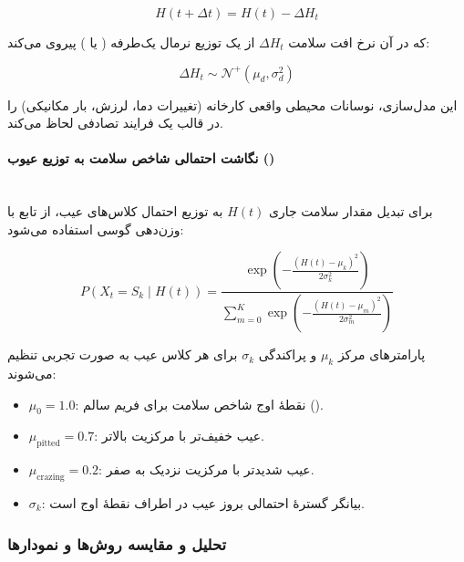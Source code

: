 \documentclass[a4paper, 10pt, twocolumn]{article}
\begin{document}
	$$H(t + \Delta t) = H(t) - \Delta H_t$$
	
	که در آن نرخ افت سلامت $\Delta H_t$ از یک توزیع نرمال یک‌طرفه ( یا ) پیروی می‌کند:
	
	$$\Delta H_t \sim \mathcal{N}^{+}(\mu_d, \sigma_d^2) $$
	
	این مدل‌سازی، نوسانات محیطی واقعی کارخانه (تغییرات دما، لرزش، بار مکانیکی) را در قالب یک فرایند تصادفی لحاظ می‌کند.
	
	\paragraph{نگاشت احتمالی شاخص سلامت به توزیع عیوب ()} \mbox{} \\
	
	برای تبدیل مقدار سلامت جاری $H(t)$ به توزیع احتمال کلاس‌های عیب، از تابع  با وزن‌دهی گوسی استفاده می‌شود:
	
	$$P(X_t = S_k \mid H(t)) = \frac{\exp\left(-\frac{(H(t) - \mu_k)^2}{2\sigma_k^2}\right)}{\sum_{m=0}^{K} \exp\left(-\frac{(H(t) - \mu_m)^2}{2\sigma_m^2}\right)} $$
	
	پارامترهای مرکز $\mu_k$ و پراکندگی $\sigma_k$ برای هر کلاس عیب به صورت تجربی تنظیم می‌شوند:
	
	\begin{itemize}
		\item $\mu_0 = 1.0$: نقطهٔ اوج شاخص سلامت برای فریم سالم ().
		\item $\mu_{\text{pitted}} = 0.7$: عیب خفیف‌تر با مرکزیت بالاتر.
		\item $\mu_{\text{crazing}} = 0.2$: عیب شدیدتر با مرکزیت نزدیک به صفر.
		\item $\sigma_k$: بیانگر گسترهٔ احتمالی بروز عیب در اطراف نقطهٔ اوج است.
	\end{itemize}
	
	
	\subsubsection*{تحلیل و مقایسه روش‌ها و نمودارها}
	
\end{document}
